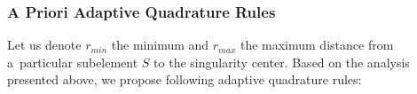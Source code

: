 
\subsubsection{A Priori Adaptive Quadrature Rules} \label{sec:adaptive_quad_rules}
Let us denote $r_{min}$ the minimum and $r_{max}$ the maximum distance from a~particular subelement $S$ to the singularity center. 
Based on the analysis presented above, we propose following adaptive quadrature rules:



